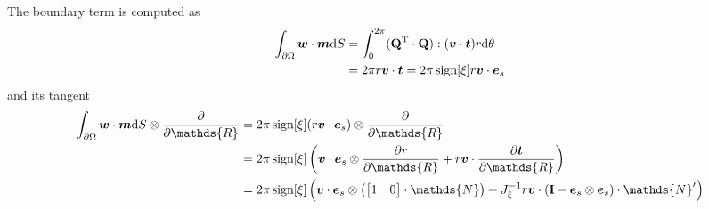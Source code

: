 \documentclass[a4paper,11pt]{article}
\renewcommand{\to}[1]{\text{\boldmath $#1$}} %
\newcommand{\ts}[1]{\text{\boldmath $\mathrm{#1}$}} %
\newcommand{\uv}[1]{\mathds{#1}}
\newcommand{\um}[1]{\mathds{#1}}
\newcommand{\intd}[1]{\mathrm{d}#1}
\newcommand{\pderiv}[2]{\frac{\partial#1}{\partial#2}}
\newcommand{\T}{\mathrm{T}}
\DeclareMathOperator{\sign}{sign}
\begin{document}
The boundary term is computed as
\begin{align}
 \int_{\partial\Omega} \to w\cdot\to m\intd S &= \int_0^{2\pi} (\ts Q^\T\cdot \ts Q):(\to v\cdot\to t) r \intd \theta\\
  &= 2\pi r \to v \cdot \to t = 2\pi\sign[\xi]r \to v\cdot \to e_s
\end{align}
and its tangent
\begin{align}
 \int_{\partial\Omega} \to w\cdot\to m\intd S \otimes \pderiv{}{\uv R} &= 2\pi\sign[\xi] (r \to v \cdot \to e_s)\otimes \pderiv{}{\uv R}\\
  &= 2 \pi \sign[\xi]\left(\to v\cdot\to e_s\otimes\pderiv{r}{\uv R} + r \to v\cdot\pderiv{\to t}{\uv R}\right)\\
  &= 2 \pi \sign[\xi]\left(\to v\cdot\to e_s\otimes\left(\begin{bmatrix}1&0\end{bmatrix}\cdot\um N\right) +  J_\xi^{-1} r \to v\cdot\left(\ts I-\to e_s\otimes\to e_s\right)\cdot \um N'\right)
\end{align}
\end{document}
